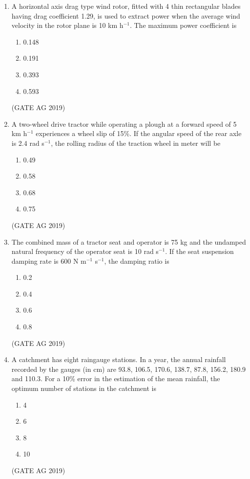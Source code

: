 \documentclass[journal,12pt,onecolumn]{IEEEtran}
\theoremstyle{remark}
\begin{document}
\begin{enumerate}
\item 
A horizontal axis drag type wind rotor, fitted with 4 thin rectangular blades having drag coefficient 1.29, is used to extract power when the average wind velocity in the rotor plane is 10 km h$^{-1}$. The maximum power coefficient is  
\begin{multicols}{4}
\begin{enumerate}
\item 0.148
\item 0.191
\item 0.393
\item 0.593
\end{enumerate}
\end{multicols}
\hfill{(GATE AG 2019)}

\item 
A two-wheel drive tractor while operating a plough at a forward speed of 5 km h$^{-1}$ experiences a wheel slip of 15\%. If the angular speed of the rear axle is 2.4 rad s$^{-1}$, the rolling radius of the traction wheel in meter will be  
\begin{multicols}{4}
\begin{enumerate}
\item 0.49
\item 0.58
\item 0.68
\item 0.75
\end{enumerate}
\end{multicols}
\hfill{(GATE AG 2019)}

\item 
The combined mass of a tractor seat and operator is 75 kg and the undamped natural frequency of the operator seat is 10 rad s$^{-1}$. If the seat suspension damping rate is 600 N m$^{-1}$ s$^{-1}$, the damping ratio is  
\begin{multicols}{4}
\begin{enumerate}
\item 0.2
\item 0.4
\item 0.6
\item 0.8
\end{enumerate}
\end{multicols}
\hfill{(GATE AG 2019)}

\item 
A catchment has eight raingauge stations. In a year, the annual rainfall recorded by the gauges (in cm) are 93.8, 106.5, 170.6, 138.7, 87.8, 156.2, 180.9 and 110.3. For a 10\% error in the estimation of the mean rainfall, the optimum number of stations in the catchment is  
\begin{multicols}{4}
\begin{enumerate}
\item 4
\item 6
\item 8
\item 10
\end{enumerate}
\end{multicols}
\hfill{(GATE AG 2019)}


\end{enumerate}
\end{document}
